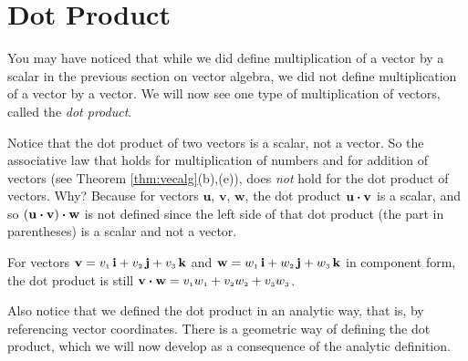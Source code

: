 \newpage
\section{Dot Product}
You may have noticed that while we did define multiplication of a vector by a scalar in the previous section on
vector algebra, we did not define multiplication of a vector by a vector. We will now see one type of
multiplication of vectors, called the \emph{dot product}.


Notice that the dot product of two vectors is a scalar, not a vector. 
So the associative law that holds for multiplication of numbers and for addition of vectors (see
Theorem \ref{thm:vecalg}(b),(e)), does \emph{not} hold for the dot product of vectors. Why? Because for vectors
$\mathbf{u}$, $\mathbf{v}$, $\mathbf{w}$, the dot product $\mathbf{u} \bm{\cdot} \mathbf{v}$ is a scalar, and so
$(\mathbf{u} \bm{\cdot} \mathbf{v}) \bm{\cdot} \mathbf{w}$ is not defined since the left side of that dot product
(the part in parentheses) is a scalar and not a vector.

For vectors $\mathbf{v} = v_{\scriptscriptstyle 1}\,\textbf{i} + v_{\scriptscriptstyle 2}\,\textbf{j} + v_{\scriptscriptstyle 3}\,\textbf{k}$ and $\mathbf{w} = w_{\scriptscriptstyle 1}\,\textbf{i} + w_{\scriptscriptstyle 2}\,\textbf{j} + w_{\scriptscriptstyle 3}\,\textbf{k}$ in component form, 
the dot product is still $\mathbf{v} \bm{\cdot} \mathbf{w} = v_{\scriptscriptstyle 1}w_{\scriptscriptstyle 1} + v_{\scriptscriptstyle 2}w_{\scriptscriptstyle 2} +
v_{\scriptscriptstyle 3}w_{\scriptscriptstyle 3}$.

Also notice that we defined the dot product in an analytic way, that is, by referencing vector coordinates. 
There is
a geometric way of defining the dot product, which we will now develop as a consequence of the analytic
definition.



